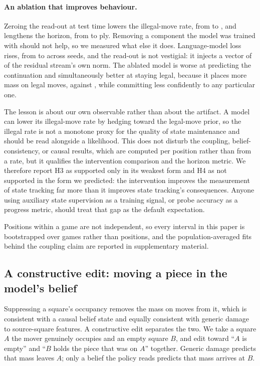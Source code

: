 \documentclass[manuscript, screen, review]{jair}
\theoremstyle{remark}
\begin{document}
\paragraph{An ablation that improves behaviour.}
Zeroing the read-out at test time lowers the illegal-move rate, from
 to , and lengthens the horizon, from
 to  ply. Removing a component the model was
trained with should not help, so we measured what else it does. Language-model
loss rises, from  to  across seeds, and the
read-out is not vestigial: it injects a vector of  of the
residual stream's own norm. The ablated model is worse at predicting the
continuation and simultaneously better at staying legal, because it places more
mass on legal moves,  against , while
committing less confidently to any particular one.

The lesson is about our own observable rather than about the artifact. A model
can lower its illegal-move rate by hedging toward the legal-move prior, so the
illegal rate is not a monotone proxy for the quality of state maintenance and
should be read alongside a likelihood. This does not disturb the coupling,
belief-consistency, or causal results, which are computed per position rather
than from a rate, but it qualifies the intervention comparison and the horizon
metric. We therefore report H3 as supported only in its weakest form and H4 as
not supported in the form we predicted: the intervention improves the measurement
of state tracking far more than it improves state tracking's consequences.
Anyone using auxiliary state supervision as a training signal, or probe accuracy
as a progress metric, should treat that gap as the default expectation.

Positions within a game are not independent, so every interval in this paper is bootstrapped over games rather than positions, and the population-averaged fits behind the coupling claim are reported in supplementary material.

\subsection{A constructive edit: moving a piece in the model's belief}
\label{sec:transfer}

Suppressing a square's occupancy removes the mass on moves from it, which is
consistent with a causal belief state and equally consistent with generic damage
to source-square features. A constructive edit separates the two. We take a
square $A$ the mover genuinely occupies and an empty square $B$, and edit toward
``$A$ is empty'' and ``$B$ holds the piece that was on $A$'' together. Generic
damage predicts that mass leaves $A$; only a belief the policy reads predicts
that mass arrives at $B$.
\end{document}
